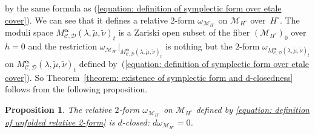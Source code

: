 \documentclass[pdftex]{sigma}
\numberwithin{equation}{section}
\newtheorem{Proposition}[Theorem]{Proposition}
\newcommand{\balpha}{\boldsymbol \alpha}
\begin{document}
by the same formula as
(\ref{equation: definition of symplectic form over etale cover}).
We can see that it defines a relative
$2$-form $\omega_{{\mathcal M}_{H^{\circ}}}$ on ${\mathcal M}_{H^{\circ}}$ over~$H^{\circ}$.
The moduli space
$M^{\balpha}_{{\mathcal C},{\mathcal D}}(\lambda,\tilde{\mu},\tilde{\nu})_t$
is a Zariski open subset of the fiber
$({\mathcal M}_{H^{\circ}})_{0}$ over $h=0$
and the restriction
$\omega_{{\mathcal M}_{H^{\circ}}}\big|
_{M^{\balpha}_{{\mathcal C},{\mathcal D}}(\lambda,\tilde{\mu},\tilde{\nu})_t}$
is nothing but the $2$-form
$\omega_{M^{\balpha}_{{\mathcal C},{\mathcal D}}(\lambda,\tilde{\mu},\tilde{\nu})_t}$
on $M^{\balpha}_{{\mathcal C},{\mathcal D}}(\lambda,\tilde{\mu},\tilde{\nu})_t$
defined by~(\ref{equation: definition of symplectic form over etale cover}).
So Theorem~\ref{theorem: existence of symplectic form and d-closedness}
follows from the following proposition.

\begin{Proposition}
The relative $2$-form
$\omega_{{\mathcal M}_{H^{\circ}}}$ on ${\mathcal M}_{H^{\circ}}$
defined by \eqref{equation: definition of unfolded relative 2-form}
is $d$-closed:
$d\omega_{{\mathcal M}_{H^{\circ}}}=0$.
\end{Proposition}
\end{document}
